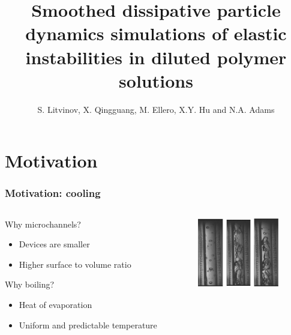 \documentclass{beamer}
\title[elastic instabilities]{Smoothed dissipative particle dynamics simulations of elastic instabilities in diluted polymer solutions}
\date{}
\author{S. Litvinov, X. Qingguang, M. Ellero, X.Y. Hu and N.A. Adams}
\institute{
  Lehrstuhl f\"{u}r Aerodynamik und Str\"{o}mungsmechanik \\
  TU M\"{u}nich
}
\begin{document}
\begin{frame}
  \titlepage
\end{frame}

\begin{frame}
  \tableofcontents
\end{frame}

\section[Motivation]{Motivation}
\begin{frame}
  \frametitle{Motivation: cooling}
  \begin{columns}
    \begin{column}{0.5\textwidth}
      \begin{block}{Why microchannels?}
        \begin{itemize}
        \item Devices are smaller
        \item Higher surface to volume ratio
        \end{itemize}
      \end{block}
      \begin{block}{Why boiling?}
        \begin{itemize}
        \item Heat of evaporation
        \item Uniform and predictable temperature
        \end{itemize}
      \end{block}
    \end{column}
    \begin{column}{0.5\textwidth}
      \begin{figure}
        \centering
        \includegraphics[width=1.1cm]{exp01.png}
        \includegraphics[width=1.1cm]{exp02.png}
        \includegraphics[width=1.1cm]{exp03.png}

\end{figure}
\end{column}
\end{columns}
\end{frame}
\end{document}

